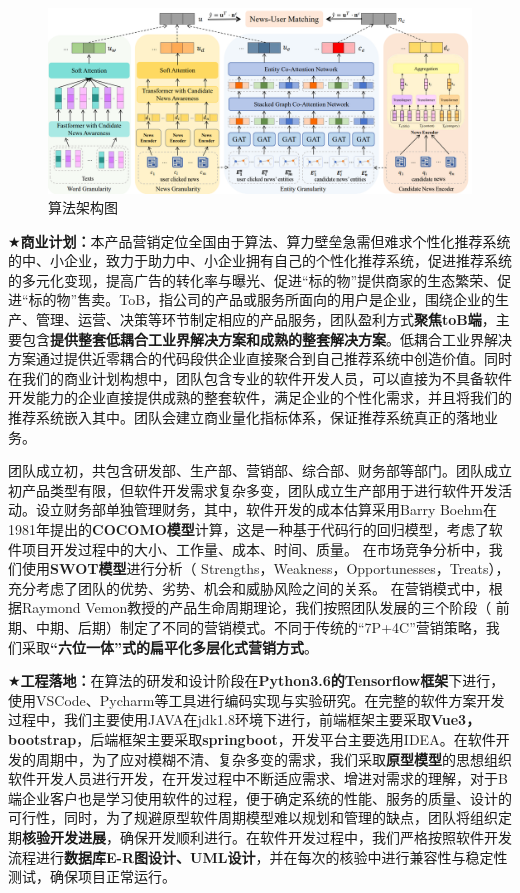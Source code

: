 \documentclass[withoutpreface,bwprint]{cumcmthesis} %
\begin{document}
		\begin{figure}[H]
				\includegraphics[width=1.0\textwidth]{MGCA}
			\caption{算法架构图}
			\label{fig:circuit-diagcam}
		\end{figure}
	    $\bigstar$\textbf{商业计划：}本产品营销定位全国由于算法、算力壁垒急需但难求个性化推荐系统的中、小企业，致力于助力中、小企业拥有自己的个性化推荐系统，促进推荐系统的多元化变现，提高广告的转化率与曝光、促进“标的物”提供商家的生态繁荣、促进“标的物”售卖。ToB，指公司的产品或服务所面向的用户是企业，围绕企业的生产、管理、运营、决策等环节制定相应的产品服务，团队盈利方式\textbf{聚焦toB端}，主要包含\textbf{提供整套低耦合工业界解决方案和成熟的整套解决方案}。低耦合工业界解决方案通过提供近零耦合的代码段供企业直接聚合到自己推荐系统中创造价值。同时在我们的商业计划构想中，团队包含专业的软件开发人员，可以直接为不具备软件开发能力的企业直接提供成熟的整套软件，满足企业的个性化需求，并且将我们的推荐系统嵌入其中。团队会建立商业量化指标体系，保证推荐系统真正的落地业务。\par
	    团队成立初，共包含研发部、生产部、营销部、综合部、财务部等部门。团队成立初产品类型有限，但软件开发需求复杂多变，团队成立生产部用于进行软件开发活动。设立财务部单独管理财务，其中，软件开发的成本估算采用Barry Boehm在1981年提出的\textbf{COCOMO模型}计算，这是一种基于代码行的回归模型，考虑了软件项目开发过程中的大小、工作量、成本、时间、质量。
	    在市场竞争分析中，我们使用\textbf{SWOT模型}进行分析（ Strengths，Weakness，Opportunesses，Treats），充分考虑了团队的优势、劣势、机会和威胁风险之间的关系。
	    在营销模式中，根据Raymond Vemon教授的产品生命周期理论，我们按照团队发展的三个阶段（ 前期、中期、后期）制定了不同的营销模式。不同于传统的“7P+4C”营销策略，我们采取\textbf{“六位一体”式的扁平化多层化式营销方式}。\par
	    $\bigstar$\textbf{工程落地：}在算法的研发和设计阶段在\textbf{Python3.6的Tensorflow框架}下进行，使用VSCode、Pycharm等工具进行编码实现与实验研究。在完整的软件方案开发过程中，我们主要使用JAVA在jdk1.8环境下进行，前端框架主要采取\textbf{Vue3，bootstrap}，后端框架主要采取\textbf{springboot}，开发平台主要选用IDEA。在软件开发的周期中，为了应对模糊不清、复杂多变的需求，我们采取\textbf{原型模型}的思想组织软件开发人员进行开发，在开发过程中不断适应需求、增进对需求的理解，对于B端企业客户也是学习使用软件的过程，便于确定系统的性能、服务的质量、设计的可行性，同时，为了规避原型软件周期模型难以规划和管理的缺点，团队将组织定期\textbf{核验开发进展}，确保开发顺利进行。在软件开发过程中，我们严格按照软件开发流程进行\textbf{数据库E-R图设计、UML设计}，并在每次的核验中进行兼容性与稳定性测试，确保项目正常运行。\par
\end{document}
